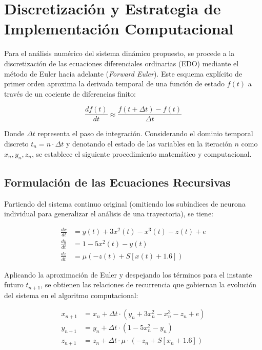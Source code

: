 \documentclass{article}
\begin{document}
\section{Discretización y Estrategia de Implementación Computacional}

Para el análisis numérico del sistema dinámico propuesto, se procede a la discretización de las ecuaciones diferenciales ordinarias (EDO) mediante el método de Euler hacia adelante (\textit{Forward Euler}). Este esquema explícito de primer orden aproxima la derivada temporal de una función de estado $f(t)$ a través de un cociente de diferencias finito:

\begin{equation}
    \frac{df(t)}{dt} \approx \frac{f(t + \Delta t) - f(t)}{\Delta t}
\end{equation}

Donde $\Delta t$ representa el paso de integración. Considerando el dominio temporal discreto $t_n = n \cdot \Delta t$ y denotando el estado de las variables en la iteración $n$ como $x_n, y_n, z_n$, se establece el siguiente procedimiento matemático y computacional.

\subsection{Formulación de las Ecuaciones Recursivas}

Partiendo del sistema continuo original (omitiendo los subíndices de neurona individual para generalizar el análisis de una trayectoria), se tiene:

\begin{equation}
\begin{aligned}
    \frac{dx}{dt} &= y(t) + 3x^2(t) - x^3(t) - z(t) + e \\
    \frac{dy}{dt} &= 1 - 5x^2(t) - y(t) \\
    \frac{dz}{dt} &= \mu \left( -z(t) + S[x(t) + 1.6] \right)
\end{aligned}
\end{equation}

Aplicando la aproximación de Euler y despejando los términos para el instante futuro $t_{n+1}$, se obtienen las relaciones de recurrencia que gobiernan la evolución del sistema en el algoritmo computacional:

\begin{align}
    x_{n+1} &= x_n + \Delta t \cdot \left( y_n + 3x_n^2 - x_n^3 - z_n + e \right) \\
    y_{n+1} &= y_n + \Delta t \cdot \left( 1 - 5x_n^2 - y_n \right) \\
    z_{n+1} &= z_n + \Delta t \cdot \mu \cdot \left( -z_n + S[x_n + 1.6] \right)
\end{align}
\end{document}
